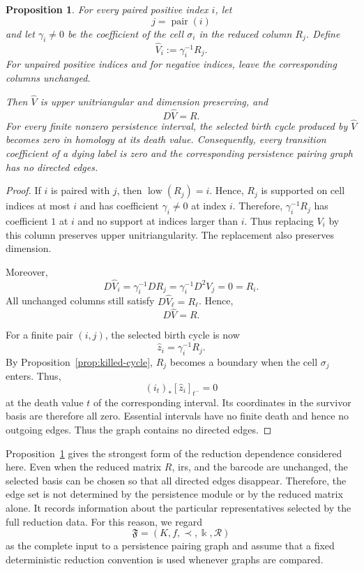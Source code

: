 \documentclass[11pt]{article}
\theoremstyle{paperdefinition}
\theoremstyle{paperplain}
\newtheorem{proposition}[definition]{Proposition}
\theoremstyle{paperremark}
\begin{document}
\begin{proposition}
\label{prop:interval-adapted-reduction}
For every paired positive index $i$, let
\[
j=\operatorname{pair}(i)
\]
and let $\gamma_i\neq0$ be the coefficient of the cell $\sigma_i$ in the reduced column $R_j$. Define
\[
\widehat V_i:=\gamma_i^{-1}R_j.
\]
For unpaired positive indices and for negative indices, leave the corresponding columns unchanged.

Then $\widehat V$ is upper unitriangular and dimension preserving, and
\[
D\widehat V=R.
\]
For every finite nonzero persistence interval, the selected birth cycle produced by $\widehat V$ becomes zero in homology at its death value. Consequently, every transition coefficient of a dying label is zero and the corresponding persistence pairing graph has no directed edges.
\end{proposition}

\begin{proof}
If $i$ is paired with $j$, then $\operatorname{low}(R_j)=i$. Hence, $R_j$ is supported on cell indices at most $i$ and has coefficient $\gamma_i\neq0$ at index $i$. Therefore, $\gamma_i^{-1}R_j$ has coefficient $1$ at $i$ and no support at indices larger than $i$. Thus replacing $V_i$ by this column preserves upper unitriangularity. The replacement also preserves dimension.

Moreover,
\[
D\widehat V_i = \gamma_i^{-1}DR_j = \gamma_i^{-1}D^2V_j = 0 = R_i.
\]
All unchanged columns still satisfy $D\widehat V_\ell=R_\ell$. Hence,
\[
D\widehat V=R.
\]

For a finite pair $(i,j)$, the selected birth cycle is now
\[
\widehat z_i=\gamma_i^{-1}R_j.
\]
By Proposition~\ref{prop:killed-cycle}, $R_j$ becomes a boundary when the cell $\sigma_j$ enters. Thus,
\[
(i_t)_*[\widehat z_i]_{t^-}=0
\]
at the death value $t$ of the corresponding interval. Its coordinates in the survivor basis are therefore all zero. Essential intervals have no finite death and hence no outgoing
edges. Thus the graph contains no directed edges.
\end{proof}

Proposition~\ref{prop:interval-adapted-reduction} gives the strongest form of the reduction dependence considered here. Even when the reduced matrix $R$, irs, and the barcode are unchanged, the selected basis can be chosen so that all directed edges disappear. Therefore, the edge set is not determined by the persistence module or by the reduced matrix alone. It records information about the particular representatives selected by the full reduction data. For this reason, we regard
\[
\mathfrak F=(K,f,\prec,\Bbbk,\mathcal R)
\]
as the complete input to a persistence pairing graph and assume that a fixed deterministic reduction convention is used whenever graphs are compared.
\end{document}
